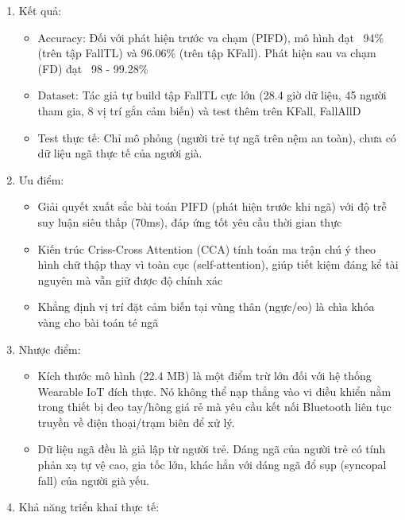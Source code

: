 \documentclass[../DoAn.tex]{subfiles}
\begin{document}
\begin{enumerate}[label=\arabic*)]
\begin{itemize}
\begin{itemize}
            \item Real-time & Low latency: Rất tốt. Thời gian suy luận (inference) chỉ tốn 70.30 ms cho 1 mẫu. Thời gian cảnh báo sớm (Lead time) đạt trung bình 456.69 ms trước khi chạm đất, hoàn toàn đủ chuẩn (yêu cầu >120 ms) để bung túi khí
        \end{itemize}
    \end{itemize}
    \item Kết quả:
    \begin{itemize}
        \item Accuracy: Đối với phát hiện trước va chạm (PIFD), mô hình đạt ~94\% (trên tập FallTL) và 96.06\% (trên tập KFall). Phát hiện sau va chạm (FD) đạt ~98 - 99.28\%
        \item Dataset: Tác giả tự build tập FallTL cực lớn (28.4 giờ dữ liệu, 45 người tham gia, 8 vị trí gắn cảm biến) và test thêm trên KFall, FallAllD
        \item Test thực tế: Chỉ mô phỏng (người trẻ tự ngã trên nệm an toàn), chưa có dữ liệu ngã thực tế của người già.
    \end{itemize}
    \item Ưu điểm:
    \begin{itemize}
        \item Giải quyết xuất sắc bài toán PIFD (phát hiện trước khi ngã) với độ trễ suy luận siêu thấp (70ms), đáp ứng tốt yêu cầu thời gian thực
        \item Kiến trúc Criss-Cross Attention (CCA) tính toán ma trận chú ý theo hình chữ thập thay vì toàn cục (self-attention), giúp tiết kiệm đáng kể tài nguyên mà vẫn giữ được độ chính xác
        \item Khẳng định vị trí đặt cảm biến tại vùng thân (ngực/eo) là chìa khóa vàng cho bài toán té ngã
    \end{itemize}
    \item Nhược điểm:
    \begin{itemize}
        \item Kích thước mô hình (22.4 MB) là một điểm trừ lớn đối với hệ thống Wearable IoT đích thực. Nó không thể nạp thẳng vào vi điều khiển nằm trong thiết bị đeo tay/hông giá rẻ mà yêu cầu kết nối Bluetooth liên tục truyền về điện thoại/trạm biên để xử lý.
        \item Dữ liệu ngã đều là giả lập từ người trẻ. Dáng ngã của người trẻ có tính phản xạ tự vệ cao, gia tốc lớn, khác hẳn với dáng ngã đổ sụp (syncopal fall) của người già yếu.
    \end{itemize}
    \item Khả năng triển khai thực tế:

\end{enumerate}
\end{document}
